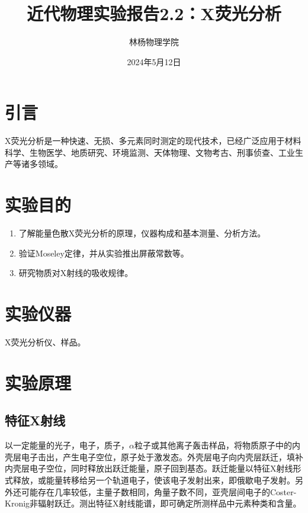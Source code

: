 \documentclass[a4paper]{article}
\title{近代物理实验报告2.2：X荧光分析}
\author{林杨\quad 211840092\quad 物理学院}
\date{2024年5月12日}
\begin{document}
\maketitle


\section{引言}
X荧光分析是一种快速、无损、多元素同时测定的现代技术，已经广泛应用于材料科学、生物医学、地质研究、环境监测、天体物理、文物考古、刑事侦查、工业生产等诸多领域。

\section{实验目的}
\begin{enumerate}
\item 了解能量色散X荧光分析的原理，仪器构成和基本测量、分析方法。
\item 验证Moseley定律，并从实验推出屏蔽常数等。
\item 研究物质对X射线的吸收规律。
\end{enumerate}

\section{实验仪器}
X荧光分析仪、样品。

\section{实验原理}
\subsection{特征X射线}
以一定能量的光子，电子，质子，$\alpha$粒子或其他离子轰击样品，将物质原子中的内壳层电子击出，产生电子空位，原子处于激发态。外壳层电子向内壳层跃迁，填补内壳层电子空位，同时释放出跃迁能量，原子回到基态。跃迁能量以特征X射线形式释放，或能量转移给另一个轨道电子，使该电子发射出来，即俄歇电子发射。另外还可能存在几率较低，主量子数相同，角量子数不同，亚壳层间电子的Coster-Kronig非辐射跃迁。测出特征X射线能谱，即可确定所测样品中元素种类和含量。
\end{document}
